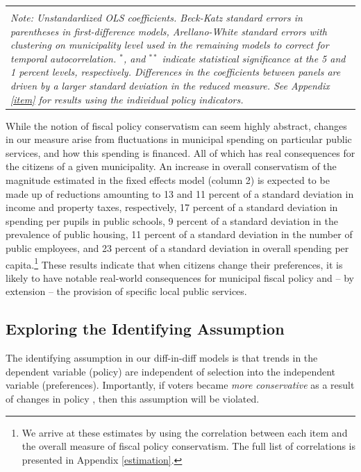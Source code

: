 \documentclass[a4paper,12pt]{article}
\begin{document}
\begin{landscape}
\begin{table}[!htbp]
\begin{tabular}{@{\extracolsep{5pt}}lcccccccc}
			\hline 
			\hline \\[-1.8ex] 
			\multicolumn{9}{p{25 cm}}{\emph{Note: Unstandardized OLS coefficients. Beck-Katz standard errors in parentheses in first-difference models, Arellano-White standard errors with clustering on municipality level used in the remaining models to correct for temporal autocorrelation. $^{*}$, and $^{**}$ indicate statistical significance at the 5 and 1 percent levels, respectively. Differences in the coefficients between panels are driven by a larger standard deviation in the reduced measure. See Appendix \ref{item} for results using the individual policy indicators.}} \\
		\end{tabular} 
	\end{table}
	
\end{landscape}

While the notion of fiscal policy conservatism can seem highly abstract, changes in our measure arise from fluctuations in municipal spending on particular public services, and how this spending is financed. All of which has real consequences for the citizens of a given municipality. An increase in overall conservatism of the magnitude estimated in the fixed effects model (column 2) is expected to be made up of reductions amounting to 13 and 11 percent of a standard deviation in income and property taxes, respectively, 17 percent of a standard deviation in spending per pupils in public schools, 9 percent of a standard deviation in the prevalence of public housing, 11 percent of a standard deviation in the number of public employees, and 23 percent of a standard deviation in overall spending per capita.\footnote{We arrive at these estimates by using the correlation between each item and the overall measure of fiscal policy conservatism. The full list of correlations is presented in Appendix \ref{estimation}.} These results indicate that when citizens change their preferences, it is likely to have notable real-world consequences for municipal fiscal policy and -- by extension -- the provision of specific local public services. 

\subsection*{Exploring the Identifying Assumption}
The identifying assumption in our diff-in-diff models is that trends in the dependent variable (policy) are independent of selection into the independent variable (preferences). Importantly, if voters became \emph{more conservative} as a result of changes in policy \cite[cf.][]{lenz2013follow}, then this assumption will be violated.
\end{document}
